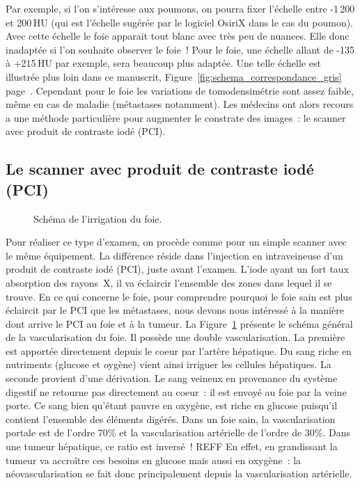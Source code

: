 \documentclass[main.tex]{subfiles}
\begin{document}
Par exemple, si l'on s'intéresse aux poumons, on pourra fixer l'échelle entre -1\,200 et 200\,HU (qui est l'échelle sugérée par le logiciel OsiriX dans le cas du poumon). Avec cette échelle le foie apparait tout blanc avec très peu de nuances. Elle donc inadaptée si l'on souhaite observer le foie~! Pour le foie, une échelle allant de -135 à +215\,HU par exemple, sera beaucoup plus adaptée. 
Une telle échelle est illustrée plus loin dans ce manuscrit, \cf Figure~\ref{fig:schema_correspondance_gris} page~\pageref{fig:schema_correspondance_gris}.
Cependant pour le foie les variations de tomodensimétrie sont assez faible, même en cas de maladie (métastases notamment). Les médecins ont alors recours a une méthode particulière pour augmenter le constrate des images~: le scanner avec produit de contraste iodé (PCI).


\subsection{Le scanner avec produit de contraste iodé (PCI)}
\begin{figure}[h]
\centering
\vspace{-10mm}
\scalebox{.7}{}
\caption{\label{fig:schema_irrig_foie} Schéma de l'irrigation du foie.}
\vspace{-10mm}
\end{figure}
Pour réaliser ce type d'examen, on procède comme pour un simple scanner avec le même équipement. La différence réside dans l'injection en intraveineuse d'un produit de contraste iodé (PCI), juste avant l'examen. L'iode ayant un fort taux absorption  des rayons~X, il va éclaircir l'ensemble des zones dans lequel il se trouve. En ce qui concerne le foie, pour comprendre pourquoi le foie sain est plus éclaircit par le PCI que les métastases, nous devons nous intéressé à la manière dont arrive le PCI au foie et à la tumeur. La Figure~\ref{fig:schema_irrig_foie} présente le schéma général de la vascularisation du foie. Il possède une double vascularisation. La première est apportée directement depuis le coeur par l'artère hépatique. Du sang riche en nutriments (glucose et oygène) vient ainsi irriguer les cellules hépatiques. La seconde provient d'une dérivation. Le sang veineux en provenance du système digestif ne retourne pas directement au coeur~: il est envoyé au foie par la veine porte. Ce sang bien qu'étant pauvre en oxygène, est riche en glucose puisqu'il contient l'ensemble des éléments digérés. Dans un foie sain, la vascularisation portale est de l'ordre 70\% et la vascularisation artérielle de l'ordre de 30\%. Dans une tumeur hépatique, ce ratio est inversé~! REFF En effet, en grandissant la tumeur va accroître ces besoins en glucose mais aussi en oxygène~: la néovascularisation se fait donc principalement depuis la vascularisation artérielle. 
\end{document}
